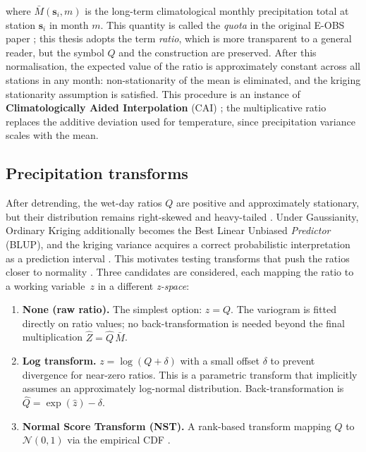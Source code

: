 where $\bar{M}(\mathbf{s}_i, m)$ is the long-term climatological monthly precipitation
total at station $\mathbf{s}_i$ in month $m$. This quantity is called the
\emph{quota} in the original E-OBS paper \cite{haylock2008european};
this thesis adopts the term \emph{ratio}, which is more transparent to a
general reader, but the symbol $Q$ and the construction are preserved.
After this normalisation, the expected value of the ratio is approximately constant
across all stations in any month: non-stationarity of the mean is eliminated,
and the kriging stationarity assumption is satisfied.
This procedure is an instance of \textbf{Climatologically Aided Interpolation}
(CAI) \cite{willmott1995cai}; the multiplicative ratio replaces the additive
deviation used for temperature, since precipitation variance scales with
the mean.

\subsection{Precipitation transforms}
\label{sec:kriging-nst}

After detrending, the wet-day ratios $Q$ are positive and approximately stationary,
but their distribution remains right-skewed and heavy-tailed
\cite{hofstra2008comparison, cecinati2017}.
Under Gaussianity, Ordinary Kriging additionally becomes the Best Linear Unbiased
\emph{Predictor} (BLUP), and the kriging variance acquires a correct probabilistic
interpretation as a prediction interval \cite{cressie1993, deutsch1998gslib}.
This motivates testing transforms that push the ratios closer to normality
\cite{cecinati2017}.
Three candidates are considered, each mapping the ratio to a working
variable~$z$ in a different \emph{z-space}:

\begin{enumerate}
  \item \textbf{None (raw ratio).}  The simplest option: $z = Q$.  The
        variogram is fitted directly on ratio values; no back-transformation is
        needed beyond the final multiplication
        $\hat{Z} = \hat{Q}\,\bar{M}$.

  \item \textbf{Log transform.}  $z = \log(Q + \delta)$ with a small
        offset $\delta$ to prevent divergence for near-zero ratios.
        This is a parametric transform that implicitly assumes an
        approximately log-normal distribution.  Back-transformation is
        $\hat{Q} = \exp(\hat{z}) - \delta$.

  \item \textbf{Normal Score Transform (NST).}  A rank-based transform
        mapping $Q$ to $\mathcal{N}(0,1)$ via the empirical CDF
        \cite{cecinati2017, deutsch1998gslib}.
\end{enumerate}

